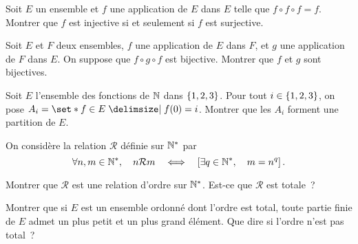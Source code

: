 \documentclass{magnolia}
\begin{document}

Soit $E$ un ensemble et $f$ une application de $E$ dans $E$ telle que $f\circ f\circ f=f$. Montrer que $f$ est injective si et seulement si $f$ est surjective.

Soit $E$ et $F$ deux ensembles, $f$ une application de $E$ dans $F$, et $g$ une application de $F$ dans $E$. On suppose que $f\circ g\circ f$ est bijective. Montrer que $f$ et $g$ sont bijectives.


Soit $E$ l'ensemble des fonctions de $\mathbb{N}$ dans $\left\{1,2,3\right\}$. Pour tout
$i\in\left\{1,2,3\right\}$, on pose $A_i=\enstq{f\in E}{f(0)=i}$. Montrer que les $A_i$
forment une partition de $E$.



On considère la relation $\mathcal{R}$ définie sur ${\mathbb{N}^*}$ par
\[\forall n,m\in{\mathbb{N}^*},\quad n\mathcal{R}m \quad\Longleftrightarrow\quad \left[\exists q\in{\mathbb{N}^*} ,\quad m=n^q\right].\]
\begin{questions}
\question Montrer que $\mathcal{R}$ est une relation d'ordre sur ${\mathbb{N}^*}$.
\question Est-ce que $\mathcal{R}$ est totale~?
\end{questions}

Montrer que si $E$ est un ensemble ordonné dont l'ordre est total, toute partie
finie de $E$ admet un plus petit et un plus grand élément. Que dire si l'ordre
n'est pas total~?
\end{document}
